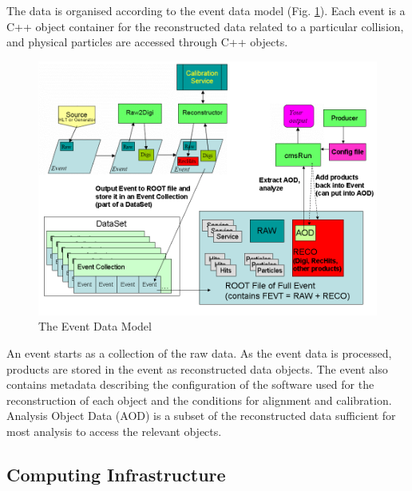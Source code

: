The data is organised according to the event data model (Fig. \ref{edm}). Each event is a C++ object container for the reconstructed data related to a particular collision, and physical particles are accessed through C++ objects.       

\begin{figure}[htb!!!]
\centering
\includegraphics[scale=0.45]{figures/experiment/edm.png} 
\caption{The Event Data Model}
\label{edm}
\end{figure}

An event starts as a collection of the raw data. As the event data is processed, products are stored in the event as reconstructed data objects. The event also contains metadata describing the configuration of the software used for the reconstruction of each object and the conditions for alignment and calibration. %
\noindent Analysis Object Data (AOD) is a subset of the reconstructed data sufficient for most analysis to access the relevant objects. 

\subsection{Computing Infrastructure}

